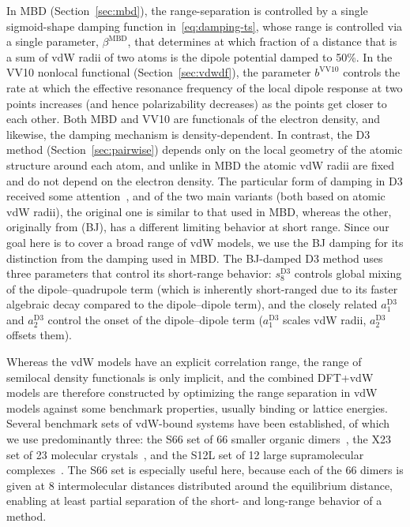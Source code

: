 In MBD (Section~\ref{sec:mbd}), the range-separation is controlled by a single sigmoid-shape damping function in~\eqref{eq:damping-ts}, whose range is controlled via a single parameter, $\beta^\text{MBD}$, that determines at which fraction of a distance that is a sum of vdW radii of two atoms is the dipole potential damped to 50\%.
In the VV10 nonlocal functional (Section~\ref{sec:vdwdf}), the parameter $b^\text{VV10}$ controls the rate at which the effective resonance frequency of the local dipole response at two points increases (and hence polarizability decreases) as the points get closer to each other.
Both MBD and VV10 are functionals of the electron density, and likewise, the damping mechanism is density-dependent.
In contrast, the D3 method (Section~\ref{sec:pairwise}) depends only on the local geometry of the atomic structure around each atom, and unlike in MBD the atomic vdW radii are fixed and do not depend on the electron density.
The particular form of damping in D3 received some attention~\cite{GrimmeJCC11,SchroderJCTC15,SmithJPCL16,WitteJCTC17}, and of the two main variants (both based on atomic vdW radii), the original one is similar to that used in MBD, whereas the other, originally from \citet{JohnsonJCP06} (BJ), has a different limiting behavior at short range.
Since our goal here is to cover a broad range of vdW models, we use the BJ damping for its distinction from the damping used in MBD\@.
The BJ-damped D3 method uses three parameters that control its short-range behavior: $s_8^\text{D3}$ controls global mixing of the dipole--quadrupole term (which is inherently short-ranged due to its faster algebraic decay compared to the dipole--dipole term), and the closely related $a_1^\text{D3}$ and $a_2^\text{D3}$ control the onset of the dipole--dipole term ($a_1^\text{D3}$ scales vdW radii, $a_2^\text{D3}$ offsets them).

Whereas the vdW models have an explicit correlation range, the range of semilocal density functionals is only implicit, and the combined DFT+vdW models are therefore constructed by optimizing the range separation in vdW models against some benchmark properties, usually binding or lattice energies.
Several benchmark sets of vdW-bound systems have been established, of which we use predominantly three: the S66 set of 66 smaller organic dimers~\cite{RezacJCTC11}, the X23 set of 23 molecular crystals~\cite{Otero-de-la-RozaJCP12,ReillyJCP13}, and the S12L set of 12 large supramolecular complexes~\cite{GrimmeCEJ12}.
The S66 set is especially useful here, because each of the 66 dimers is given at 8 intermolecular distances distributed around the equilibrium distance, enabling at least partial separation of the short- and long-range behavior of a method.

